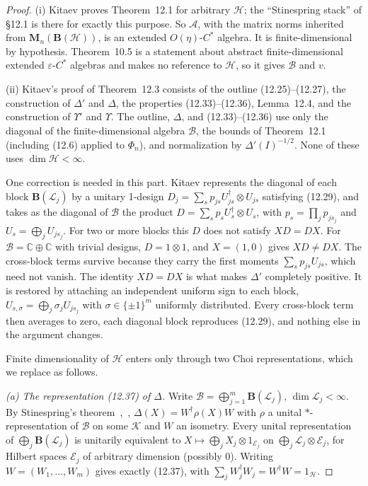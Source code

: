 \documentclass[11pt]{article}
\theoremstyle{remark}
\newcommand{\eps}{\varepsilon}
\newcommand{\cA}{\mathcal{A}}
\newcommand{\cB}{\mathcal{B}}
\newcommand{\cH}{\mathcal{H}}
\newcommand{\cK}{\mathcal{K}}
\newcommand{\cL}{\mathcal{L}}
\newcommand{\cE}{\mathcal{E}}
\newcommand{\Bo}{\mathbf{B}}
\newcommand{\Ma}[1]{\mathbf{M}_{#1}}
\begin{document}
\begin{proof}
(i) Kitaev proves Theorem~12.1 for arbitrary $\cH$; the ``Stinespring stack'' of \S12.1 is there for exactly this purpose. So $\cA$, with the matrix norms inherited from $\Ma{n}(\Bo(\cH))$, is an extended $O(\eta)$-$C^*$ algebra. It is finite-dimensional by hypothesis. Theorem~10.5 is a statement about abstract finite-dimensional extended $\eps$-$C^*$ algebras and makes no reference to $\cH$, so it gives $\cB$ and $v$.

(ii) Kitaev's proof of Theorem~12.3 consists of the outline (12.25)--(12.27), the construction of $\Delta'$ and $\Delta$, the properties (12.33)--(12.36), Lemma~12.4, and the construction of $\Upsilon'$ and $\Upsilon$. The outline, $\Delta$, and (12.33)--(12.36) use only the diagonal of the finite-dimensional algebra $\cB$, the bounds of Theorem~12.1 (including (12.6) applied to $\Phi_n$), and normalization by $\Delta'(I)^{-1/2}$. None of these uses $\dim\cH<\infty$.

One correction is needed in this part. Kitaev represents the diagonal of each block $\Bo(\cL_j)$ by a unitary 1-design $D_j=\sum_sp_{js}U_{js}^\dagger\otimes U_{js}$ satisfying (12.29), and takes as the diagonal of $\cB$ the product $D=\sum_sp_sU_s^\dagger\otimes U_s$, with $p_s=\prod_jp_{js_j}$ and $U_s=\bigoplus_jU_{js_j}$. For two or more blocks this $D$ does not satisfy $XD=DX$. For $\cB=\mathbb{C}\oplus\mathbb{C}$ with trivial designs, $D=1\otimes1$, and $X=(1,0)$ gives $XD\neq DX$. The cross-block terms survive because they carry the first moments $\sum_sp_{js}U_{js}$, which need not vanish. The identity $XD=DX$ is what makes $\Delta'$ completely positive. It is restored by attaching an independent uniform sign to each block, $U_{s,\sigma}=\bigoplus_j\sigma_jU_{js_j}$ with $\sigma\in\{\pm1\}^m$ uniformly distributed. Every cross-block term then averages to zero, each diagonal block reproduces (12.29), and nothing else in the argument changes.

Finite dimensionality of $\cH$ enters only through two Choi representations, which we replace as follows.

\emph{(a) The representation (12.37) of $\Delta$.} Write $\cB=\bigoplus_{j=1}^m\Bo(\cL_j)$, $\dim\cL_j<\infty$. By Stinespring's theorem~\cite{Stinespring},~\cite[Thm.~4.1]{Paulsen}, $\Delta(X)=W^\dagger\rho(X)W$ with $\rho$ a unital $*$-representation of $\cB$ on some $\cK$ and $W$ an isometry. Every unital representation of $\bigoplus_j\Bo(\cL_j)$ is unitarily equivalent to $X\mapsto\bigoplus_j X_j\otimes1_{\cE_j}$ on $\bigoplus_j\cL_j\otimes\cE_j$, for Hilbert spaces $\cE_j$ of arbitrary dimension (possibly $0$). Writing $W=(W_1,\dots,W_m)$ gives exactly (12.37), with $\sum_jW_j^\dagger W_j=W^\dagger W=1_\cH$.


\end{proof}
\end{document}
